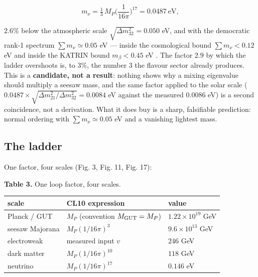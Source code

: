 \documentclass[aps,prd,amsmath,amssymb,superscriptaddress,longbibliography,floatfix,preprint]{revtex4-2}
\begin{document}
\[m_\nu = \tfrac13\,M_P\Big(\frac{1}{16\pi}\Big)^{17} = 0.0487\ \mathrm{eV},\]

$2.6\%$ below the atmospheric scale $\sqrt{\Delta m^2_{32}} = 0.050$ eV, and with the democratic rank-1 spectrum $\sum m_\nu \simeq 0.05$ eV --- inside the cosmological bound $\sum m_\nu < 0.12$ eV and inside the KATRIN bound $m_\beta < 0.45$ eV \cite{ref16}. The factor $2.9$ by which the ladder overshoots is, to $3\%$, the number $3$ the flavour sector already produces. This is a \textbf{candidate, not a result}: nothing shows why a mixing eigenvalue should multiply a seesaw mass, and the same factor applied to the solar scale ($0.0487\times\sqrt{\Delta m^2_{21}/\Delta m^2_{32}} = 0.0084$ eV against the measured $0.0086$ eV) is a second coincidence, not a derivation. What it does buy is a sharp, falsifiable prediction: normal ordering with $\sum m_\nu \simeq 0.05$ eV and a vanishing lightest mass.

\subsection{The ladder}

One factor, four scales (Fig. 3, Fig. 11, Fig. 17):

\begin{table}[htb]
\textbf{Table 3.} One loop factor, four scales. \\[4pt]
\begin{center}\footnotesize
\renewcommand{\arraystretch}{1.45}
\begin{tabular}{lll}
\toprule
\textbf{scale} & \textbf{CL10 expression} & \textbf{value} \\
\midrule
Planck / GUT & $M_P$ (convention $M_{\rm GUT} = M_P$) & $1.22\times10^{19}$ GeV \\
\arrayrulecolor{black!40}\hline\arrayrulecolor{black}
seesaw Majorana & $M_P(1/16\pi)^3$ & $9.6\times10^{13}$ GeV \\
\arrayrulecolor{black!40}\hline\arrayrulecolor{black}
electroweak & measured input $v$ & $246$ GeV \\
\arrayrulecolor{black!40}\hline\arrayrulecolor{black}
dark matter & $M_P(1/16\pi)^{10}$ & $118$ GeV \\
\arrayrulecolor{black!40}\hline\arrayrulecolor{black}
neutrino & $M_P(1/16\pi)^{17}$ & $0.146$ eV \\
\bottomrule
\end{tabular}
\end{center}
\end{table}
\end{document}
